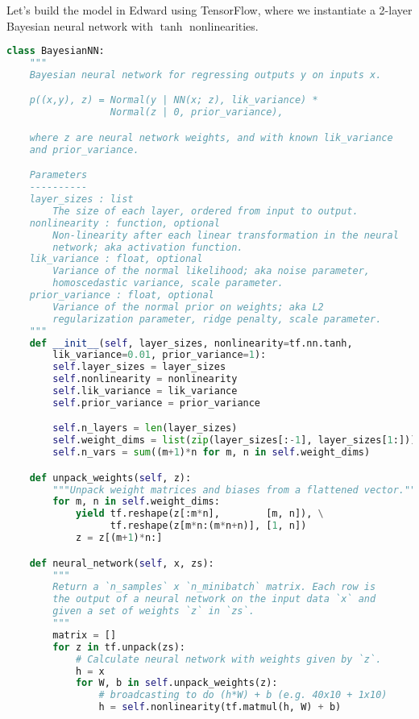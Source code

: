 Let's build the model in Edward using TensorFlow, where we
instantiate a 2-layer Bayesian neural network with $\tanh$
nonlinearities.
\begin{lstlisting}[language=Python]
class BayesianNN:
    """
    Bayesian neural network for regressing outputs y on inputs x.

    p((x,y), z) = Normal(y | NN(x; z), lik_variance) *
                  Normal(z | 0, prior_variance),

    where z are neural network weights, and with known lik_variance
    and prior_variance.

    Parameters
    ----------
    layer_sizes : list
        The size of each layer, ordered from input to output.
    nonlinearity : function, optional
        Non-linearity after each linear transformation in the neural
        network; aka activation function.
    lik_variance : float, optional
        Variance of the normal likelihood; aka noise parameter,
        homoscedastic variance, scale parameter.
    prior_variance : float, optional
        Variance of the normal prior on weights; aka L2
        regularization parameter, ridge penalty, scale parameter.
    """
    def __init__(self, layer_sizes, nonlinearity=tf.nn.tanh,
        lik_variance=0.01, prior_variance=1):
        self.layer_sizes = layer_sizes
        self.nonlinearity = nonlinearity
        self.lik_variance = lik_variance
        self.prior_variance = prior_variance

        self.n_layers = len(layer_sizes)
        self.weight_dims = list(zip(layer_sizes[:-1], layer_sizes[1:]))
        self.n_vars = sum((m+1)*n for m, n in self.weight_dims)

    def unpack_weights(self, z):
        """Unpack weight matrices and biases from a flattened vector."""
        for m, n in self.weight_dims:
            yield tf.reshape(z[:m*n],        [m, n]), \
                  tf.reshape(z[m*n:(m*n+n)], [1, n])
            z = z[(m+1)*n:]

    def neural_network(self, x, zs):
        """
        Return a `n_samples` x `n_minibatch` matrix. Each row is
        the output of a neural network on the input data `x` and
        given a set of weights `z` in `zs`.
        """
        matrix = []
        for z in tf.unpack(zs):
            # Calculate neural network with weights given by `z`.
            h = x
            for W, b in self.unpack_weights(z):
                # broadcasting to do (h*W) + b (e.g. 40x10 + 1x10)
                h = self.nonlinearity(tf.matmul(h, W) + b)


\end{lstlisting}
